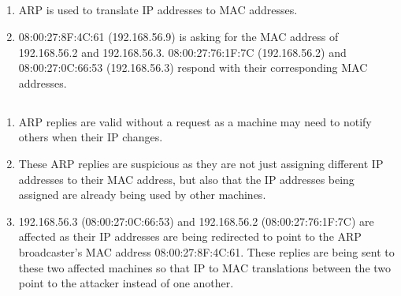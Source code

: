 \documentclass[12pt]{exam}
\begin{document}
\subsection{}

\begin{enumerate}[label=\alph*)]
    \item ARP is used to translate IP addresses to MAC addresses.
    \item 08:00:27:8F:4C:61 (192.168.56.9) is asking for the MAC address of
    192.168.56.2 and 192.168.56.3.  08:00:27:76:1F:7C (192.168.56.2) and
    08:00:27:0C:66:53 (192.168.56.3) respond with their corresponding MAC
    addresses.
\end{enumerate}

\subsection{}

\begin{enumerate}[label=\alph*)]
    \item ARP replies are valid without a request as a machine may need to
    notify others when their IP changes.
    \item These ARP replies are suspicious as they are not just assigning
    different IP addresses to their MAC address, but also that the IP addresses
    being assigned are already being used by other machines.
    \item 192.168.56.3 (08:00:27:0C:66:53) and 192.168.56.2 (08:00:27:76:1F:7C)
    are affected as their IP addresses are being redirected to point to the ARP
    broadcaster's MAC address 08:00:27:8F:4C:61.  These replies are being sent
    to these two affected machines so that IP to MAC translations between the
    two point to the attacker instead of one another.
\end{enumerate}

\subsection{}
\end{document}
